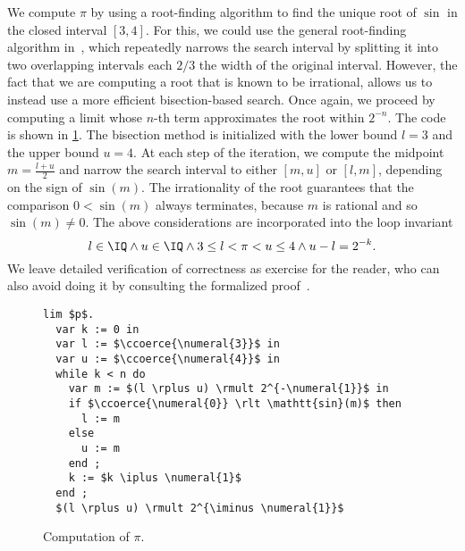 We compute $\pi$ by using a root-finding algorithm to find the unique root of $\sin$ in the closed interval $[3,4]$.
For this, we could use the general root-finding algorithm in~\cite{brausse2016semantics}, which repeatedly narrows the search interval by splitting it into two overlapping intervals each $2/3$ the width of the original interval.
However, the fact that  we are computing a root that is known to be irrational, allows us to instead use a more efficient bisection-based search.
%
Once again, we proceed by computing a limit whose $n$-th term approximates the root within $2^{-n}$.
%
The code is shown in \cref{fig:pi-def}.
%
The bisection method is initialized with the lower bound $l = 3$ and the upper bound $u = 4$.
At each step of the iteration, we compute the midpoint $m = \frac{l + u}{2}$ and narrow the search interval to either $[m, u]$ or $[l, m]$, depending on the sign of $\sin(m)$. The irrationality of the  root guarantees that the comparison $0 < \sin(m)$ always terminates, because $m$ is rational and so $\sin(m) \neq 0$.
%
The above considerations are incorporated into the loop invariant
%
\begin{equation*}
  l \in \IQ \land u \in \IQ \land 3 \leq l < \pi < u \leq 4 \land u - l= 2^{-k}.
\end{equation*}
%
We leave detailed verification of correctness as exercise for the reader, who can also avoid doing it by consulting the formalized proof~\cite{clerical_coq}.
%
\begin{figure}
  \centering
  \begin{mdframed}
  \small
\begin{lstlisting}
lim $p$.
  var k := 0 in
  var l := $\ccoerce{\numeral{3}}$ in
  var u := $\ccoerce{\numeral{4}}$ in
  while k < n do
    var m := $(l \rplus u) \rmult 2^{-\numeral{1}}$ in
    if $\ccoerce{\numeral{0}} \rlt \mathtt{sin}(m)$ then
      l := m
    else
      u := m
    end ;
    k := $k \iplus \numeral{1}$
  end ;
  $(l \rplus u) \rmult 2^{\iminus \numeral{1}}$
\end{lstlisting}
  \end{mdframed}
  \caption{Computation of $\pi$.}
  \label{fig:pi-def}
\end{figure}

